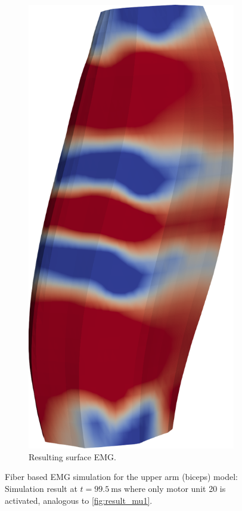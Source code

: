 \begin{figure}[H]
\begin{subfigure}[t]{0.25\textwidth}
    \includegraphics[width=\textwidth]{images/results/application/mu20b.png}%
    \caption{Resulting surface EMG.}%
    \label{fig:mu20b}%
  \end{subfigure}   
  \caption{Fiber based EMG simulation for the upper arm (biceps) model: Simulation result at $t=\SI{99.5}{\milli\second}$ where only motor unit 20 is activated, analogous to \cref{fig:result_mu1}.}%
  \label{fig:result_mu20}%
\end{figure}%

